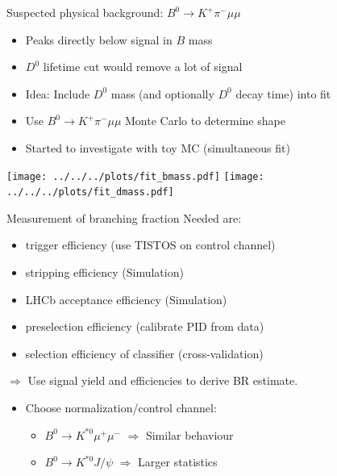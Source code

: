 \documentclass[compress,aspectratio=43]{beamer}
\begin{document}
\begin{frame}{Suspected physical background: $B^0\to K^+\pi^-\mu\mu$}
  \begin{itemize}
      \item Peaks directly below signal in $B$ mass
      \item $D^0$ lifetime cut would remove a lot of signal
      \item Idea: Include $D^0$ mass (and optionally $D^0$ decay time) into fit 
      \item Use $B^0\to K^+\pi^-\mu\mu$ Monte Carlo to determine shape
    \item Started to investigate with toy MC (simultaneous fit)
  \end{itemize}
  \centering
  \texttt{[image: ../../../plots/fit\_bmass.pdf]}
  \texttt{[image: ../../../plots/fit\_dmass.pdf]}
\end{frame}

\begin{frame}{Measurement of branching fraction}
  Needed are:
  \begin{itemize}
    \item trigger efficiency (use TISTOS on control channel)
    \item stripping efficiency (Simulation)
    \item LHCb acceptance efficiency (Simulation)
    \item preselection efficiency (calibrate PID from data)
    \item selection efficiency of classifier (cross-validation)
  \end{itemize}
  $\Rightarrow$ Use signal yield and efficiencies to derive BR estimate.
  \begin{itemize}
    \item Choose normalization/control channel:
      \begin{itemize}
        \item $B^0\to K^{*0}\mu^+\mu^-$ $\Rightarrow$ Similar behaviour
        \item $B^0 \to K^{*0}J\!/\!\psi$ $\Rightarrow$ Larger statistics
      \end{itemize}
  \end{itemize}
\end{frame}
\end{document}
